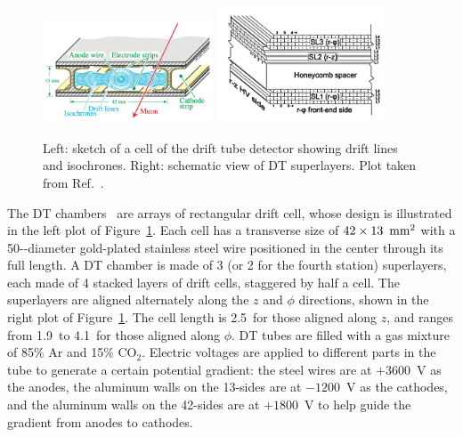 \begin{figure}[!htb]
    \centering
    \includegraphics[width=0.45\textwidth]{pics/LHC_CMS/DT.png}
    \includegraphics[width=0.45\textwidth]{pics/LHC_CMS/DT_superlayer.png}
    \caption{Left: sketch of a cell of the drift tube detector showing drift lines and isochrones.
             Right: schematic view of DT superlayers.
             Plot taken from Ref.~\cite{collaboration_2013}.}
    \label{fig:cms_dt}
\end{figure}

The DT chambers~\cite{Collaboration_2008, collaboration_2013} are arrays of rectangular drift cell, whose design is illustrated in the left plot of Figure~\ref{fig:cms_dt}.
Each cell has a transverse size of $42 \times 13~\,\text{mm}^{2}$ with a 50-\mum-diameter 
gold-plated stainless steel wire positioned in the center through its full length.
A DT chamber is made of 3 (or 2 for the fourth station) superlayers, each made of 4 stacked layers of drift cells, staggered by half a cell.
The superlayers are aligned alternately along the $z$ and $\phi$ directions, shown in the right plot of Figure~\ref{fig:cms_dt}.
The cell length is 2.5~\meter for those aligned along $z$, and ranges from 1.9~\meter to 4.1~\meter for those aligned along $\phi$.
DT tubes are filled with a gas mixture of 85\% Ar and 15\% $\text{CO}_{2}$.
Electric voltages are applied to different parts in the tube to generate a certain potential gradient:
the steel wires are at $+3600$~V as the anodes, the aluminum walls on the 13-\mm sides are at $-1200$~V as the cathodes,
and the aluminum walls on the 42-\mm sides are at $+1800$~V to help guide the gradient from anodes to cathodes.

